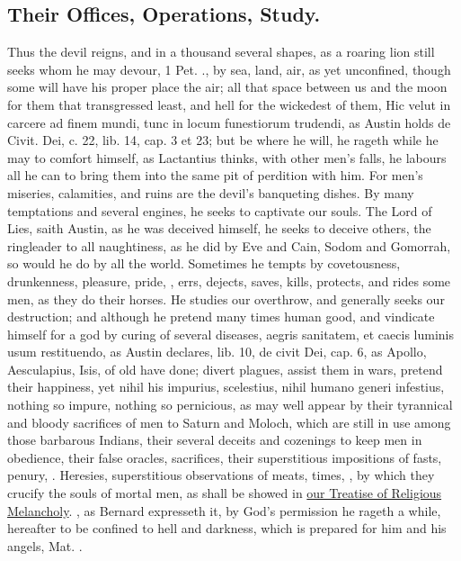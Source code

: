 {{\subsection{Their Offices, Operations, Study.}
Thus the devil reigns, and in a thousand several shapes, as a roaring lion still seeks whom he may
devour, 1 Pet. ., by sea, land, air, as yet unconfined, though 
some will have his proper place the air; all that space between us and
the moon for them that transgressed least, and hell for the wickedest
of them, Hic velut in carcere ad finem mundi, tunc in locum funestiorum
trudendi, as Austin holds de Civit. Dei, c. 22, lib. 14, cap. 3 et 23;
but be where he will, he rageth while he may to comfort himself, as
 Lactantius thinks, with other men's falls, he labours all he can
to bring them into the same pit of perdition with him. For men's
miseries, calamities, and ruins are the devil's banqueting dishes. By
many temptations and several engines, he seeks to captivate our souls.
The Lord of Lies, saith Austin, as he was deceived himself, he
seeks to deceive others, the ringleader to all naughtiness, as he did
by Eve and Cain, Sodom and Gomorrah, so would he do by all the world.
Sometimes he tempts by covetousness, drunkenness, pleasure, pride, \etc{},
errs, dejects, saves, kills, protects, and rides some men, as they do
their horses. He studies our overthrow, and generally seeks our
destruction; and although he pretend many times human good, and
vindicate himself for a god by curing of several diseases, aegris
sanitatem, et caecis luminis usum restituendo, as Austin declares, lib.
10, de civit Dei, cap. 6, as Apollo, Aesculapius, Isis, of old have
done; divert plagues, assist them in wars, pretend their happiness, yet
nihil his impurius, scelestius, nihil humano generi infestius, nothing
so impure, nothing so pernicious, as may well appear by their
tyrannical and bloody sacrifices of men to Saturn and Moloch, which are
still in use among those barbarous Indians, their several deceits and
cozenings to keep men in obedience, their false oracles, sacrifices,
their superstitious impositions of fasts, penury, \etc{}. Heresies,
superstitious observations of meats, times, \etc{}, by which they 
crucify the souls of mortal men, as shall be showed in \hyperref[ch:religious-melancholy]{our Treatise of
Religious Melancholy}. , as Bernard expresseth it, by God's permission he rageth a while, hereafter
to be confined to hell and darkness, which is prepared for him and his
angels, Mat. .

}}
